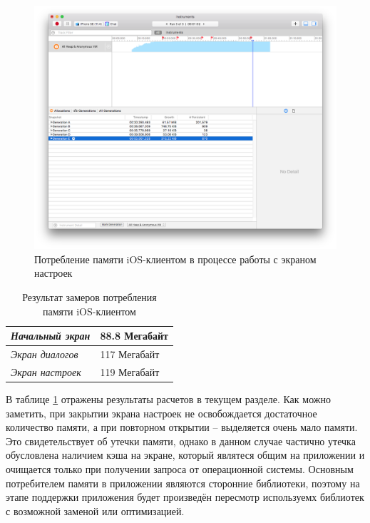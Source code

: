 \begin{figure}[h]
  \centering
    \includegraphics[width=1\textwidth]{inc/img/memory_generations.png}
  \caption{Потребление памяти iOS-клиентом в процессе работы с экраном настроек}
  \label{sec:eng:memory:generations}
\end{figure}

\begin{table}[h!]
\caption{Результат замеров потребления памяти iOS-клиентом}
\label{sec:eng:memory:result}
\centering
\begin{tabularx}{\textwidth}{ |X|X| } 
 \hline
 \emph{Начальный экран} & \num{88.8} Мегабайт \\ 
 \hline
 \emph{Экран диалогов} & \num{117} Мегабайт \\ 
 \hline
 \emph{Экран настроек} & \num{119} Мегабайт \\ 
 \hline
\end{tabularx}
\end{table}

В таблице \ref{sec:eng:memory:result} отражены результаты расчетов в текущем разделе. Как можно заметить, при закрытии экрана настроек не освобождается достаточное количество памяти, а при повторном открытии -- выделяется очень мало памяти. Это свидетельствует об утечки памяти, однако в данном случае частично утечка обусловлена наличием кэша на экране, который являтеся общим на приложении и очищается только при получении запроса от операционной системы. Основным потребителем памяти в приложении являются сторонние библиотеки, поэтому на этапе поддержки приложения будет произведён пересмотр используемх библиотек с возможной заменой или оптимизацией.